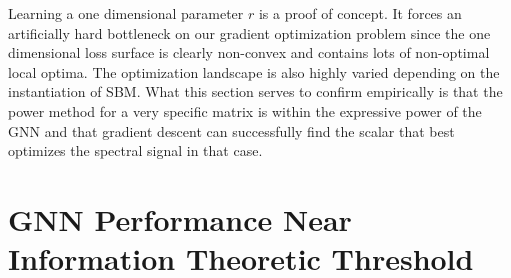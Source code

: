 Learning a one dimensional parameter $r$ is a proof of concept.  It forces an artificially hard bottleneck on our gradient optimization problem since the one dimensional loss surface is clearly non-convex and contains lots of non-optimal local optima. The optimization landscape is also highly varied depending on the instantiation of SBM.  What this section serves to confirm empirically is that the power method for a very specific matrix is within the expressive power of the GNN and that gradient descent can successfully find the scalar that best optimizes the spectral signal in that case. 

\newpage

\section{GNN Performance Near Information Theoretic Threshold}
